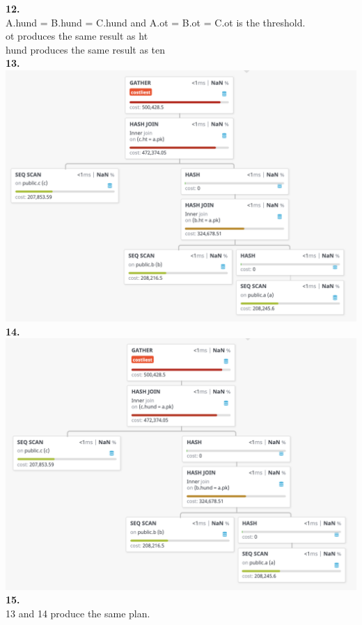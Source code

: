 \documentclass[12pt, letterpaper, fleqn]{article}
\begin{document}
  \textbf{12.} \\
  A.hund = B.hund = C.hund and A.ot = B.ot = C.ot is the threshold. \\
  ot produces the same result as ht \\
  hund produces the same result as ten \\

  \textbf{13.}\\
  \includegraphics[scale=0.5]{query_pics/13.png} \\

  \textbf{14.}\\
  \includegraphics[scale=0.5]{query_pics/14.png} \\

  \textbf{15.} \\
  13 and 14 produce the same plan. \\
\end{document}
